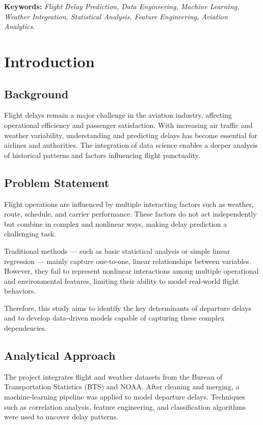 \documentclass[a4paper,12pt]{report}
\begin{document}
\noindent\textbf{Keywords:} \textit{Flight Delay Prediction, Data Engineering, Machine Learning, Weather Integration, Statistical Analysis, Feature Engineering, Aviation Analytics.}

\chapter{Introduction}
\section{Background}
Flight delays remain a major challenge in the aviation industry, affecting operational efficiency and passenger satisfaction. With increasing air traffic and weather variability, understanding and predicting delays has become essential for airlines and authorities. The integration of data science enables a deeper analysis of historical patterns and factors influencing flight punctuality.

\section{Problem Statement}
Flight operations are influenced by multiple interacting factors such as weather, route, schedule, and carrier performance. These factors do not act independently but combine in complex and nonlinear ways, making delay prediction a challenging task.

Traditional methods — such as basic statistical analysis or simple linear regression — mainly capture one-to-one, linear relationships between variables. However, they fail to represent nonlinear interactions among multiple operational and environmental features, limiting their ability to model real-world flight behaviors.

Therefore, this study aims to identify the key determinants of departure delays and to develop data-driven models capable of capturing these complex dependencies.

\section{Analytical Approach}
The project integrates flight and weather datasets from the Bureau of Transportation Statistics (BTS) and NOAA. After cleaning and merging, a machine-learning pipeline was applied to model departure delays. Techniques such as correlation analysis, feature engineering, and classification algorithms were used to uncover delay patterns.
\end{document}
